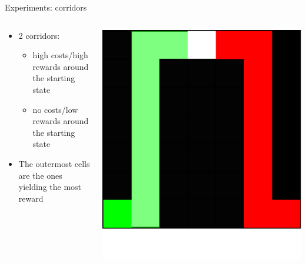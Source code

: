 \documentclass{beamer}
\begin{document}
    \begin{frame}{Experiments: corridors}

        \begin{columns}
            \begin{column}{0.7\textwidth}
                \begin{itemize}
                    \item 2 corridors:
                    \begin{itemize}
                        \item high costs/high rewards around the starting state
                        \item no costs/low rewards around the starting state
                    \end{itemize}
                    \item The outermost cells are the ones yielding the most reward
                \end{itemize}
            \end{column}
            \begin{column}{0.3\textwidth}  %
                \begin{center}
                    \includegraphics[width=\textwidth]{talk/img/env-corridor.pdf}
                \end{center}
            \end{column}
        \end{columns}

    \end{frame}
\end{document}
